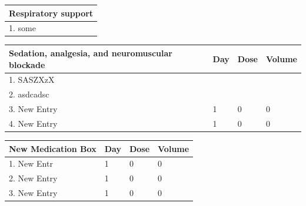 \documentclass{article}
\begin{document}
\begin{minipage}[t]{0.45\textwidth}
\vspace{-2.73cm} %

    

    \begin{tabular}{|p{12cm}|}
        \hline
        \textbf{Respiratory support} \\
        \hline
       1. some \\
        \hline
    \end{tabular}
    \vspace{0.2cm}

    \begin{tabular}{|p{7cm}|p{1cm}|p{2cm}|p{2cm}|}
        \hline
        \textbf{Sedation, analgesia, and neuromuscular blockade} & \textbf{Day} & \textbf{Dose} & \textbf{Volume} \\
        \hline
       1. SASZXzX &  &  &  \\
        \hline
       2. asdcadsc &  &  &  \\
        \hline
       3. New Entry & 1 & 0 & 0 \\
        \hline
       4. New Entry & 1 & 0 & 0 \\
        \hline
    \end{tabular}
    \vspace{0.2cm}

    \begin{tabular}{|p{7cm}|p{1cm}|p{2cm}|p{2cm}|}
        \hline
        \textbf{New Medication Box} & \textbf{Day} & \textbf{Dose} & \textbf{Volume} \\
        \hline
       1. New Entr & 1 & 0 & 0 \\
        \hline
       2. New Entry & 1 & 0 & 0 \\
        \hline
       3. New Entry & 1 & 0 & 0 \\
        \hline
    \end{tabular}
    \vspace{0.2cm}

\end{minipage}%
\hfill%
\end{document}

